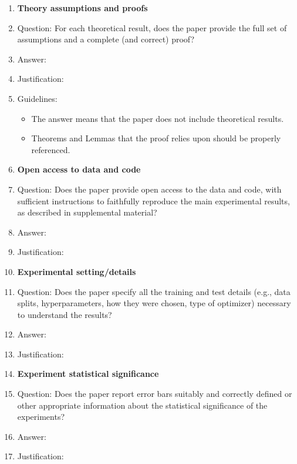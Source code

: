 \begin{enumerate}
\item {\bf Theory assumptions and proofs}
    \item[] Question: For each theoretical result, does the paper provide the full set of assumptions and a complete (and correct) proof?
    \item[] Answer: \answerNA{}
    \item[] Justification: 
    \item[] Guidelines:
    \begin{itemize}
        \item The answer \answerNA{} means that the paper does not include theoretical results.
        \item Theorems and Lemmas that the proof relies upon should be properly referenced.
    \end{itemize}

\item {\bf Open access to data and code}
    \item[] Question: Does the paper provide open access to the data and code, with sufficient instructions to faithfully reproduce the main experimental results, as described in supplemental material?
    \item[] Answer: \answerNo{}
    \item[] Justification: 

\item {\bf Experimental setting/details}
    \item[] Question: Does the paper specify all the training and test details (e.g., data splits, hyperparameters, how they were chosen, type of optimizer) necessary to understand the results?
    \item[] Answer: \answerNo{}
    \item[] Justification: 

\item {\bf Experiment statistical significance}
    \item[] Question: Does the paper report error bars suitably and correctly defined or other appropriate information about the statistical significance of the experiments?
    \item[] Answer: \answerNo{}
    \item[] Justification: 


\end{enumerate}
